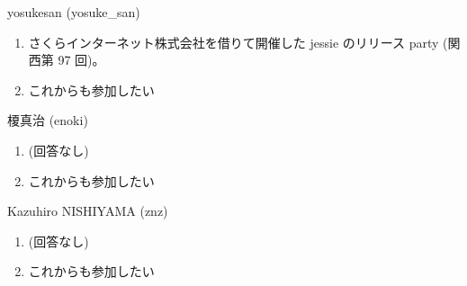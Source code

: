 \begin{prework}{ yosukesan (yosuke\_san) }
  \begin{enumerate}
  \item さくらインターネット株式会社を借りて開催した jessie のリリース party (関西第 97 回)。
  \item これからも参加したい
  \end{enumerate}
\end{prework}

\begin{prework}{ 榎真治 (enoki) }
  \begin{enumerate}
  \item (回答なし)
  \item これからも参加したい
  \end{enumerate}
\end{prework}

\begin{prework}{ Kazuhiro NISHIYAMA (znz) }
  \begin{enumerate}
  \item (回答なし)
  \item これからも参加したい
  \end{enumerate}
\end{prework}
